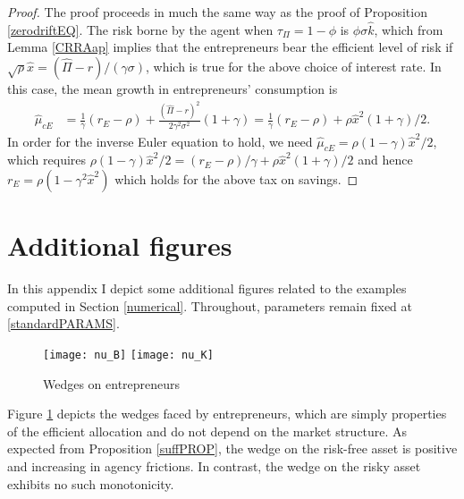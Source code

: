 \documentclass[11pt]{article}
\theoremstyle{plain}
\theoremstyle{definition} %
\begin{document}
\iffalse
\mu_a & = \frac{1}{\gamma}[(1 - \tau_{sE})(r + \rho_D) - \rho] +  \frac{(\Pi - r)^2}{2\gamma^2\sigma^2}(1+\gamma)  &
\sigma_a & = \frac{\Pi - r}{\gamma \sigma}. \fi

\begin{proof}%
The proof proceeds in much the same way as the proof of Proposition \ref{zerodriftEQ}. The risk borne by the agent when $\tau_{\Pi} = 1-\phi$ is $\phi \sigma \hat{k}$, which from Lemma \ref{CRRAap} implies that the entrepreneurs bear the efficient level of risk if $\sqrt{\rho} \hat{x} = (\hat{\Pi} - r)/(\gamma \sigma)$, which is true for the above choice of interest rate. In this case, the mean growth in entrepreneurs' consumption is
\begin{align*}
\hat{\mu}_{cE} & = \frac{1}{\gamma}(r_E - \rho) + \frac{(\hat{\Pi} - r)^2}{2\gamma^2\sigma^2}(1+\gamma) 
 = \frac{1}{\gamma}(r_E - \rho) + \rho \hat{x}^2(1+\gamma)/2.
\end{align*}
In order for the inverse Euler equation to hold, we need $\hat{\mu}_{cE} = \rho(1-\gamma)\hat{x}^2/2$, which requires $\rho(1-\gamma)\hat{x}^2/2 = (r_E - \rho)/\gamma + \rho \hat{x}^2(1+\gamma)/2$ and hence $r_E = \rho(1 - \gamma^2 \hat{x}^2)$ which holds for the above tax on savings. 
\end{proof}

\section{Additional figures} \label{figuresAPP}

In this appendix I depict some additional figures related to the examples computed in Section \ref{numerical}. Throughout, parameters remain fixed at \eqref{standardPARAMS}.

\begin{figure}[H]
\centering
\texttt{[image: nu\_B]}
\texttt{[image: nu\_K]}
\caption{Wedges on entrepreneurs}
\label{wedge} 
\end{figure} 

Figure \ref{wedge} depicts the wedges faced by entrepreneurs, which are simply properties of the efficient allocation and do not depend on the market structure. As expected from Proposition \ref{suffPROP}, the wedge on the risk-free asset is positive and increasing in agency frictions. In contrast, the wedge on the risky asset exhibits no such monotonicity. 
\end{document}
